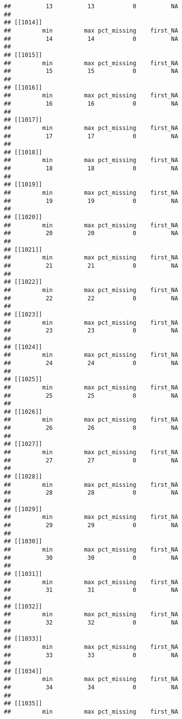 \documentclass[
]{article}
\begin{document}
\begin{verbatim}
##          13          13           0          NA 
## 
## [[1014]]
##         min         max pct_missing    first_NA 
##          14          14           0          NA 
## 
## [[1015]]
##         min         max pct_missing    first_NA 
##          15          15           0          NA 
## 
## [[1016]]
##         min         max pct_missing    first_NA 
##          16          16           0          NA 
## 
## [[1017]]
##         min         max pct_missing    first_NA 
##          17          17           0          NA 
## 
## [[1018]]
##         min         max pct_missing    first_NA 
##          18          18           0          NA 
## 
## [[1019]]
##         min         max pct_missing    first_NA 
##          19          19           0          NA 
## 
## [[1020]]
##         min         max pct_missing    first_NA 
##          20          20           0          NA 
## 
## [[1021]]
##         min         max pct_missing    first_NA 
##          21          21           0          NA 
## 
## [[1022]]
##         min         max pct_missing    first_NA 
##          22          22           0          NA 
## 
## [[1023]]
##         min         max pct_missing    first_NA 
##          23          23           0          NA 
## 
## [[1024]]
##         min         max pct_missing    first_NA 
##          24          24           0          NA 
## 
## [[1025]]
##         min         max pct_missing    first_NA 
##          25          25           0          NA 
## 
## [[1026]]
##         min         max pct_missing    first_NA 
##          26          26           0          NA 
## 
## [[1027]]
##         min         max pct_missing    first_NA 
##          27          27           0          NA 
## 
## [[1028]]
##         min         max pct_missing    first_NA 
##          28          28           0          NA 
## 
## [[1029]]
##         min         max pct_missing    first_NA 
##          29          29           0          NA 
## 
## [[1030]]
##         min         max pct_missing    first_NA 
##          30          30           0          NA 
## 
## [[1031]]
##         min         max pct_missing    first_NA 
##          31          31           0          NA 
## 
## [[1032]]
##         min         max pct_missing    first_NA 
##          32          32           0          NA 
## 
## [[1033]]
##         min         max pct_missing    first_NA 
##          33          33           0          NA 
## 
## [[1034]]
##         min         max pct_missing    first_NA 
##          34          34           0          NA 
## 
## [[1035]]
##         min         max pct_missing    first_NA 

\end{verbatim}
\end{document}
